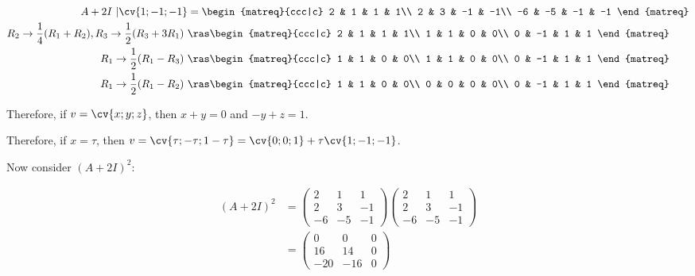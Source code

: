\documentclass[11pt]{scrartcl}
\begin{document}
\begin{soln}
\begin{align}
A+2I\  | \cv{1;-1;-1}  & =
  \begin{matreq}{ccc|c}
   2 & 1   & 1  & 1\\
   2  & 3 & -1 & -1\\
   -6 & -5  & -1 & -1
  \end{matreq}\\
R_2\to \frac{1}{4}(R_1+R_2), R_3\to \frac{1}{2}(R_{3}+3R_1)\ &\ras
  \begin{matreq}{ccc|c}
   2 & 1   & 1  & 1\\
   1  & 1 & 0 & 0\\
   0 & -1  & 1 & 1
  \end{matreq}\\
R_1\to \frac{1}{2}(R_1-R_3) \ &\ras
        \begin{matreq}{ccc|c}
   1 & 1   & 0  & 0\\
   1  & 1 & 0 & 0\\
   0 & -1  & 1 & 1
        \end{matreq}\\
R_1\to \frac{1}{2}(R_1-R_2) \ &\ras
        \begin{matreq}{ccc|c}
   1 & 1   & 0  & 0\\
   0  & 0 & 0 & 0\\
   0 & -1  & 1 & 1
        \end{matreq}
\end{align}

Therefore, if $v = \cv{x;y;z}$, then $x+y = 0$ and $-y+z = 1$.

Therefore, if $x= \tau$, then $v = \cv{\tau;-\tau;1-\tau} = \cv{0;0;1}+\tau\cv{1;-1;-1}$.

Now consider $(A+2I)^2$:

\begin{align}
(A+2I)^2 &= 
 \begin{pmatrix}
   2 & 1   & 1  \\
   2  & 3 & -1 \\
   -6 & -5  & -1
 \end{pmatrix}
 \begin{pmatrix}
   2 & 1   & 1  \\
   2  & 3 & -1 \\
   -6 & -5  & -1
 \end{pmatrix}\\
&= 
  \begin{pmatrix}
0 & 0 & 0\\
16 & 14 & 0\\
-20 & -16 & 0
  \end{pmatrix}
\end{align}


\end{soln}
\end{document}
